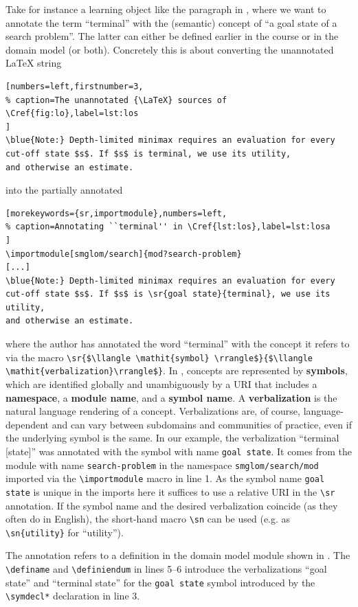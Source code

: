\documentclass[runningheads]{llncs}
\def\llangle{\langle\kern-.2em\langle}
\def\rrangle{\rangle\kern-.2em\rangle}
\begin{document}
Take for instance a learning object like the paragraph in ,
    where we want to annotate the
term ``terminal'' with the (semantic) concept of ``a goal state of a search problem''. The
latter can either be defined earlier in the course or in the domain model (or
both). Concretely this is about converting the unannotated {\LaTeX} string
\begin{lstlisting}[numbers=left,firstnumber=3,
% caption=The unannotated {\LaTeX} sources of \Cref{fig:lo},label=lst:los
]
\blue{Note:} Depth-limited minimax requires an evaluation for every
cut-off state $s$. If $s$ is terminal, we use its utility,
and otherwise an estimate.
\end{lstlisting}
into the partially annotated 
\begin{lstlisting}[morekeywords={sr,importmodule},numbers=left,
% caption=Annotating ``terminal'' in \Cref{lst:los},label=lst:losa
]
\importmodule[smglom/search]{mod?search-problem}
[...]
\blue{Note:} Depth-limited minimax requires an evaluation for every
cut-off state $s$. If $s$ is \sr{goal state}{terminal}, we use its utility,
and otherwise an estimate.
\end{lstlisting}
where the author has annotated the word ``terminal'' with the concept it refers to via the
\sTeX macro
\lstinline[mathescape]|\sr{$\llangle \mathit{symbol} \rrangle$}{$\llangle \mathit{verbalization}\rrangle$}|.
In \sTeX, concepts are represented by \textbf{symbols}, which are identified globally and
unambiguously by a URI that includes a \textbf{namespace}, a \textbf{module name}, and a
\textbf{symbol name}.  A \textbf{verbalization} is the natural language rendering of a
concept.  Verbalizations are, of course, language-dependent and can vary between
subdomains and communities of practice, even if the underlying symbol is the same.  In our
example, the verbalization ``terminal [state]'' was annotated with the symbol with name
\lstinline|goal state|. It comes from the module with name \lstinline|search-problem| in
the namespace \lstinline|smglom/search/mod| imported via the \lstinline|\importmodule|
macro in line 1. As the symbol name \lstinline|goal state| is unique in the imports here
it suffices to use a relative URI in the \lstinline|\sr| annotation. If the symbol name
and the desired verbalization coincide (as they often do in English), the short-hand macro
\lstinline|\sn| can be used (e.g. as \lstinline|\sn{utility}| for ``utility'').


The annotation refers to a definition in the domain model module shown in
.  The \lstinline|\definame| and \lstinline|\definiendum| in lines
5--6 introduce the verbalizations ``goal state'' and ``terminal state'' for the
\lstinline|goal state| symbol introduced by the \lstinline|\symdecl*| declaration in
line 3.
\end{document}
